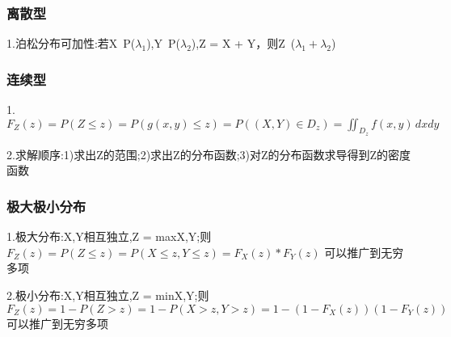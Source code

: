 \documentclass[11pt,twoside,a4paper]{ctexart}
\begin{document}
    \subsubsection{离散型}
    1.泊松分布可加性:若X~P($\lambda _1$),Y~P($\lambda _2$),Z = X + Y，则Z~($\lambda _1 + \lambda _2$) 

    \subsubsection{连续型}
    1.$F_Z(z) = P(Z \leq z) = P(g(x,y) \leq z) = P((X,Y)\in D_z) = \iint _{D_z}f(x,y)\,dxdy$

    2.求解顺序:1)求出Z的范围;2)求出Z的分布函数;3)对Z的分布函数求导得到Z的密度函数

    \subsubsection{极大极小分布}
    1.极大分布:X,Y相互独立,Z = max{X,Y};则$F_Z(z) =  P(Z \leq z) = P(X \leq z , Y \leq z) = F_X(z)*F_Y(z)$
    可以推广到无穷多项

    2.极小分布:X,Y相互独立,Z = min{X,Y};则$F_Z(z) =  1 - P(Z > z ) = 1 - P(X > z,Y > z) = 1 - (1 - F_X(z))(1 - F_Y(z))$
    可以推广到无穷多项
\end{document}
